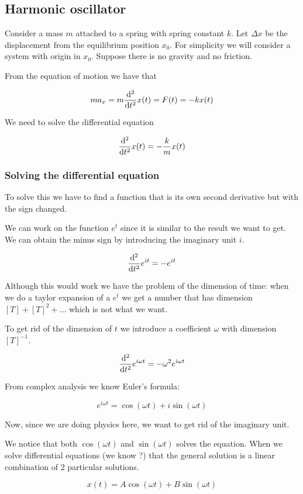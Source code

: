 \documentclass[10pt]{extarticle}
\begin{document}
\subsection{Harmonic oscillator}

Consider a mass $m$ attached to a spring with spring constant $k$. Let $\Delta x$ be the displacement from the equilibrium position $x_0$. For simplicity we will consider a system with origin in $x_0$. Suppose there is no gravity and no friction.

From the equation of motion we have that

$$
    m a_x = m \dv[2]{t}x(t) = F(t) = - k x(t)
$$

We need to solve the differential equation

$$
    \dv[2]{t}x(t) = - \frac{k}{m} x(t)
$$

\subsubsection{Solving the differential equation}

To solve this we have to find a function that is its own second derivative but with the sign changed.

We can work on the function $e^t$ since it is similar to the result we want to get. We can obtain the minus sign by introducing the imaginary unit $i$.

$$
    \dv[2]{t}e^{i t} = - e^{i t}
$$

Although this would work we have the problem of the dimension of time: when we do a taylor expansion of a $e^t$ we get a number that has dimension $[T] + [T]^2 + \dots$ which is not what we want.

To get rid of the dimension of $t$ we introduce a coefficient $\omega$ with dimension $[T]^{-1}$.

$$
    \dv[2]{t}e^{i \omega t} = - \omega^2 e^{i \omega t}
$$

From complex analysis we know Euler's formula:

$$
    e^{i \omega t} = \cos (\omega t) + i \sin (\omega t)
$$

Now, since we are doing physics here, we want to get rid of the imaginary unit.

We notice that both $\cos(\omega t)$ and $\sin(\omega t)$ solves the equation. When we solve differential equations (we know ?) that the general solution is a linear combination of 2 particular solutions.

$$
    x(t) = A \cos(\omega t) + B \sin(\omega t)
$$
\end{document}

